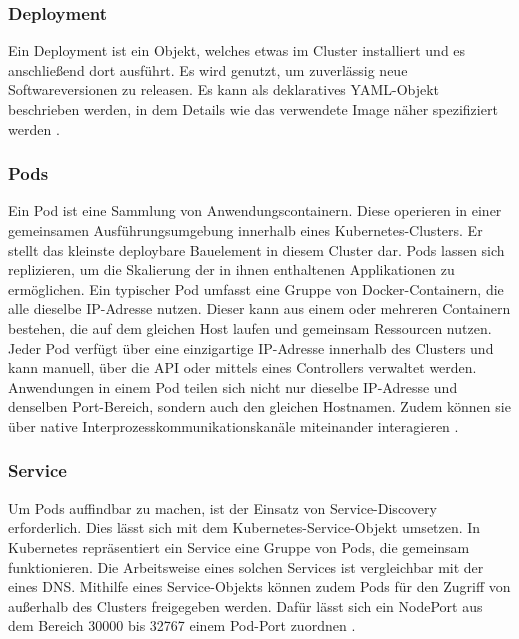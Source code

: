 {\subsubsection{Deployment}

Ein Deployment ist ein Objekt, welches etwas im Cluster installiert und es anschließend dort ausführt. Es wird genutzt, um zuverlässig neue Softwareversionen zu releasen. Es kann als deklaratives YAML-Objekt beschrieben werden, in dem Details wie das verwendete Image näher spezifiziert werden \cite[S. 175]{stender} \cite[S.117-127]{burns1}.

\subsubsection{Pods}

Ein Pod ist eine Sammlung von Anwendungscontainern. Diese operieren in einer gemeinsamen Ausführungsumgebung innerhalb eines Kubernetes-Clusters. Er stellt das kleinste deploybare Bauelement in diesem Cluster dar. Pods lassen sich replizieren, um die Skalierung der in ihnen enthaltenen Applikationen zu ermöglichen. Ein typischer Pod umfasst eine Gruppe von Docker-Containern, die alle dieselbe IP-Adresse nutzen. Dieser kann aus einem oder mehreren Containern bestehen, die auf dem gleichen Host laufen und gemeinsam Ressourcen nutzen. Jeder Pod verfügt über eine einzigartige IP-Adresse innerhalb des Clusters und kann manuell, über die API oder mittels eines Controllers verwaltet werden. Anwendungen in einem Pod teilen sich nicht nur dieselbe IP-Adresse und denselben Port-Bereich, sondern auch den gleichen Hostnamen. Zudem können sie über native Interprozesskommunikationskanäle miteinander interagieren \cite[S.48,49]{burns1}\cite[S.80-81]{riti} \cite[S. 176]{stender}.

\subsubsection{Service}

Um Pods auffindbar zu machen, ist der Einsatz von Service-Discovery erforderlich. Dies lässt sich mit dem Kubernetes-Service-Objekt umsetzen. In Kubernetes repräsentiert ein Service eine Gruppe von Pods, die gemeinsam funktionieren. Die Arbeitsweise eines solchen Services ist vergleichbar mit der eines DNS. Mithilfe eines Service-Objekts können zudem Pods für den Zugriff von außerhalb des Clusters freigegeben werden. Dafür lässt sich ein \glqq NodePort\grqq{} aus dem Bereich 30000 bis 32767 einem Pod-Port zuordnen \cite[S.77-80]{burns1} \cite[S.80-81]{riti} \cite[S. 177-178]{stender}.

}
